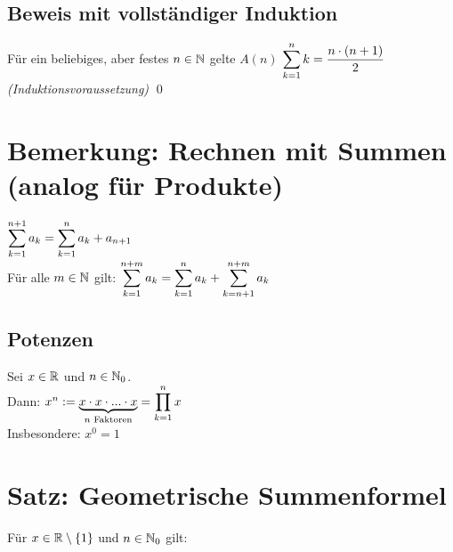 \subsection*{Beweis mit vollständiger Induktion}
Für ein beliebiges, aber festes $n \in \mathbb{N}$ gelte $A(n)$ $\displaystyle\sum_{k=1}^n k = \frac{n \cdot (n+1)}{2}$ \emph{(Induktionsvoraussetzung)}
\qed

\newpage

{}
\section*{Bemerkung: Rechnen mit Summen (analog für Produkte)}
$\displaystyle\sum_{k=1}^{n+1} a_k = \displaystyle\sum_{k=1}^n a_k + a_{n+1}$\\
Für alle $m \in \mathbb{N}$ gilt: $\displaystyle\sum_{k=1}^{n+m} a_k = \displaystyle\sum_{k=1}^n a_k + \displaystyle\sum_{k=n+1}^{n+m} a_k$

\subsection*{Potenzen}
Sei $x \in \mathbb{R}$ und $n \in \mathbb{N}_0$.\\
Dann: $x^n := \underbrace{x \cdot x \cdot ... \cdot x}_{n \text{ Faktoren}} = \displaystyle\prod_{k=1}^n x$\\
Insbesondere: $x^0 = 1$

\section{Satz: Geometrische Summenformel}\label{2.4}
Für $x \in \mathbb{R} \setminus \{1\}$ und $n \in \mathbb{N}_0$ gilt: 

